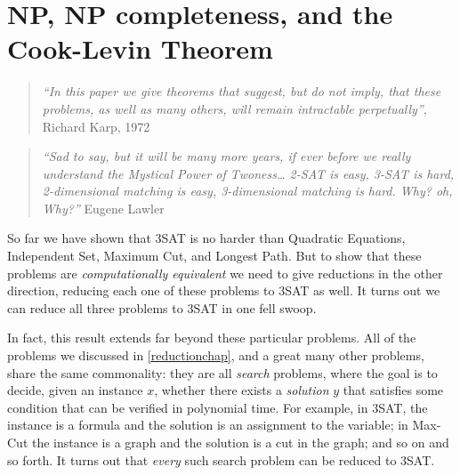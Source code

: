 \chapter{NP, NP completeness, and the Cook-Levin
Theorem}\label{cooklevinchap}


\begin{quote}
\emph{``In this paper we give theorems that suggest, but do not imply,
that these problems, as well as many others, will remain intractable
perpetually''}, Richard Karp, 1972
\end{quote}

\begin{quote}
\emph{``Sad to say, but it will be many more years, if ever before we
really understand the Mystical Power of Twoness\ldots{} 2-SAT is easy,
3-SAT is hard, 2-dimensional matching is easy, 3-dimensional matching is
hard. Why? oh, Why?''} Eugene Lawler
\end{quote}

So far we have shown that 3SAT is no harder than Quadratic Equations,
Independent Set, Maximum Cut, and Longest Path. But to show that these
problems are \emph{computationally equivalent} we need to give
reductions in the other direction, reducing each one of these problems
to 3SAT as well. It turns out we can reduce all three problems to 3SAT
in one fell swoop.

In fact, this result extends far beyond these particular problems. All
of the problems we discussed in \cref{reductionchap}, and a great many
other problems, share the same commonality: they are all \emph{search}
problems, where the goal is to decide, given an instance \(x\), whether
there exists a \emph{solution} \(y\) that satisfies some condition that
can be verified in polynomial time. For example, in 3SAT, the instance
is a formula and the solution is an assignment to the variable; in
Max-Cut the instance is a graph and the solution is a cut in the graph;
and so on and so forth. It turns out that \emph{every} such search
problem can be reduced to 3SAT.


